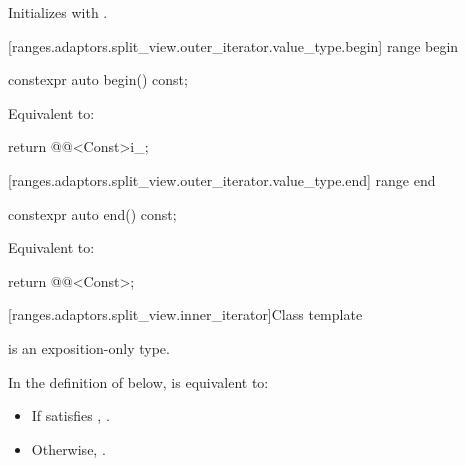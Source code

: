 \begin{itemdescr}
\pnum
\effects Initializes  with .
\end{itemdescr}

[ranges.adaptors.split_view.outer_iterator.value_type.begin]{ range begin}

%
\begin{itemdecl}
constexpr auto begin() const;
\end{itemdecl}

\begin{itemdescr}
\pnum
\effects Equivalent to:
\begin{codeblock}
return @@<Const>{i_};
\end{codeblock}
\end{itemdescr}

[ranges.adaptors.split_view.outer_iterator.value_type.end]{ range end}

%
\begin{itemdecl}
constexpr auto end() const;
\end{itemdecl}

\begin{itemdescr}
\pnum
\effects Equivalent to:
\begin{codeblock}
return @@<Const>{};
\end{codeblock}
\end{itemdescr}

[ranges.adaptors.split_view.inner_iterator]{Class template }

\pnum
\enternote {} is an exposition-only type.\exitnote

\pnum
In the definition of  below,
 is equivalent to:
\begin{itemize}
\item If  satisfies , .
\item Otherwise, .
\end{itemize}

